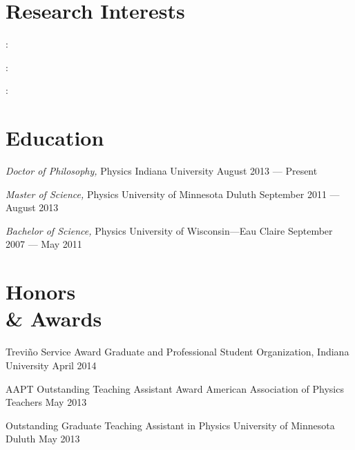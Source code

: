 \documentclass{cv}
\begin{document}
\begin{resume}



\section{Research Interests}

 : 
\itemSep

 : 
\itemSep

 : 



\section{Education}



\object																		
{\emph{Doctor of Philosophy,} Physics}										
{Indiana University}														
{August 2013 --- Present}


\object																		
{\emph{Master of Science,} Physics}											
{University of Minnesota Duluth}											
{September 2011 --- August 2013}	


\object
{\emph{Bachelor of Science,} Physics}											
{University of Wisconsin---Eau Claire}									
{September 2007 --- May 2011}



\section{Honors \\ \& Awards}

\object
{Trevi\~{n}o Service Award}
{Graduate and Professional Student Organization, Indiana University}
{April 2014}

\object
{AAPT Outstanding Teaching Assistant Award}
{American Association of Physics Teachers}
{May 2013}


\object
{Outstanding Graduate Teaching Assistant in Physics}
{University of Minnesota Duluth}
{May 2013}



\end{resume}
\end{document}
